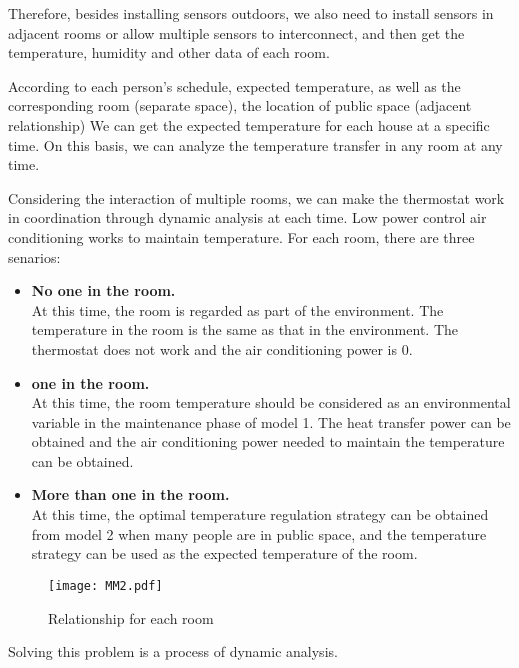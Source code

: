\documentclass{mcmthesis}
\begin{document}
			Therefore, besides installing sensors outdoors, we also need to install sensors in adjacent rooms or allow multiple sensors to interconnect, and then get the temperature, humidity and other data of each room.
			
			According to each person's schedule, expected temperature, as well as the corresponding room (separate space), the location of public space (adjacent relationship) We can get the expected temperature for each house at a specific time. On this basis, we can analyze the temperature transfer in any room at any time. 
			
			Considering the interaction of multiple rooms, we can make the thermostat work in coordination through dynamic analysis at each time. Low power control air conditioning works to maintain temperature. For each room, there are three senarios:
			
			\begin{itemize}
				\item \textbf{No one in the room.}\\
				At this time, the room is regarded as part of the environment. The temperature in the room is the same as that in the environment. The thermostat does not work and the air conditioning power is 0.
				
				\item \textbf{one in the room.}\\
				At this time, the room temperature should be considered as an environmental variable in the maintenance phase of model 1. The heat transfer power can be obtained and the air conditioning power needed to maintain the temperature can be obtained.
				
				\item \textbf{More than one in the room.}\\
				At this time, the optimal temperature regulation strategy can be obtained from model 2 when many people are in public space, and the temperature strategy can be used as the expected temperature of the room.
				
			\end{itemize}
		
			\begin{figure}[h]
				\small
				\centering
				\texttt{[image: MM2.pdf]}
				\caption{Relationship for each room} \label{fig:process3}
			\end{figure}
		
			Solving this problem is a process of dynamic analysis.
			
\end{document}
